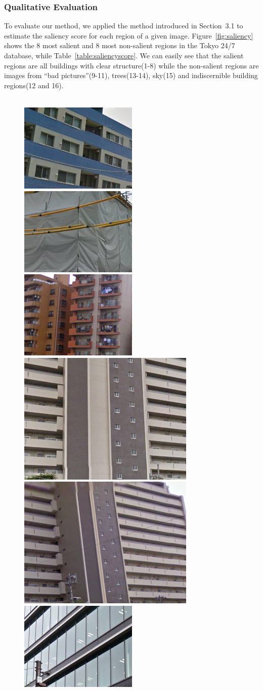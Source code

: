 \subsubsection{Qualitative Evaluation}
\par
To evaluate our method, we applied the method introduced in Section~3.1 to estimate the saliency score for each region of a given image. Figure~\ref{fig:saliency} shows the 8 most salient and 8 most non-salient regions in the Tokyo 24/7 database, while Table~\ref{table:saliencyscore}. We can easily see that the salient regions are all buildings with clear structure(1-8) while the non-salient regions are images from ``bad pictures''(9-11), trees(13-14), sky(15) and indiscernible building regions(12 and 16). 
\begin{figure}[htbp]
~\\[0.1cm]
\includegraphics[width=0.2\linewidth]{img/sal_1}
\includegraphics[width=0.2\linewidth]{img/sal_2}
\includegraphics[width=0.2\linewidth]{img/sal_3}
\includegraphics[width=0.2\linewidth]{img/sal_4}
\\[0.1cm]
\includegraphics[width=0.2\linewidth]{img/sal_5} 
\includegraphics[width=0.2\linewidth]{img/sal_6} 

\end{figure}
